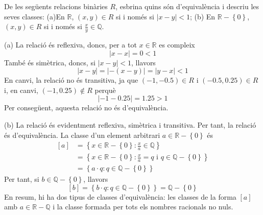 \begin{exer}
De les seg\"{u}ents relacions bin\`{a}ries $R$, esbrina quins s\'{o}n
d'equival\`{e}ncia i descriu les seves classes: (a)En $\mathbb{R}$, $\left(
x,y\right) \in R$ si i nom\'{e}s si $\left\vert x-y\right\vert <1$; (b) En $%
\mathbb{R}-\left\{ 0\right\} $, $\left( x,y\right) \in R$ si i nom\'{e}s si $%
\frac{x}{y}\in \mathbb{Q}$.
\end{exer}

\begin{solucio}
(a) La relaci\'{o} \'{e}s reflexiva, doncs, per a tot $x\in \mathbb{R}$ es
compleix%
\begin{equation*}
\left\vert x-x\right\vert =0<1
\end{equation*}%
Tamb\'{e} \'{e}s sim\`{e}trica, doncs, si $\left\vert x-y\right\vert <1$,
llavors%
\begin{equation*}
\left\vert x-y\right\vert =\left\vert -\left( x-y\right) \right\vert
=\left\vert y-x\right\vert <1
\end{equation*}%
En canvi, la relaci\'{o} no \'{e}s transitiva, ja que $\left( -1,-0.5\right)
\in R$ i $\left( -0.5,0.25\right) \in R$ i, en canvi, $\left( -1,0.25\right)
\notin R$ perqu\`{e}%
\begin{equation*}
\left\vert -1-0.25\right\vert =1.25>1
\end{equation*}%
Per conseg\"{u}ent, aquesta relaci\'{o} no \'{e}s d'equival\`{e}ncia.

(b) La relaci\'{o} \'{e}s evidentment reflexiva, sim\`{e}trica i transitiva.
Per tant, la relaci\'{o} \'{e}s d'equival\`{e}ncia. La classe d'un element
arbitrari $a\in \mathbb{R}-\left\{ 0\right\} $ \'{e}s%
\begin{align*}
\left[ a\right] & =\left\{ x\in \mathbb{R}-\left\{ 0\right\} :\frac{x}{a}\in
\mathbb{Q}\right\} \\
& =\left\{ x\in \mathbb{R}-\left\{ 0\right\} :\frac{x}{a}=q\text{ \ i \ }%
q\in \mathbb{Q}-\left\{ 0\right\} \right\} \\
& =\left\{ a\cdot q:q\in \mathbb{Q}-\left\{ 0\right\} \right\}
\end{align*}%
Per tant, si $b\in \mathbb{Q}-\left\{ 0\right\} $, llavors%
\begin{equation*}
\left[ b\right] =\left\{ b\cdot q:q\in \mathbb{Q}-\left\{ 0\right\} \right\}
=\mathbb{Q}-\left\{ 0\right\}
\end{equation*}%
En resum, hi ha dos tipus de classes d'equival\`{e}ncia: les classes de la
forma $\left[ a\right] $ amb $a\in \mathbb{R}-\mathbb{Q}$ i la classe
formada per tots els nombres racionals no nuls.
\end{solucio}

